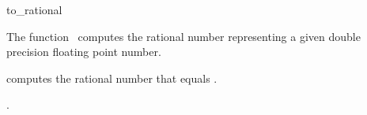 \begin{ccRefFunction}{to_rational}

\ccDefinition

The function \ccRefName\ computes the rational number representing a
given double precision floating point number.


{
computes the rational number that equals .
}

\ccImplementation


\ccSeeAlso

.

\end{ccRefFunction}
